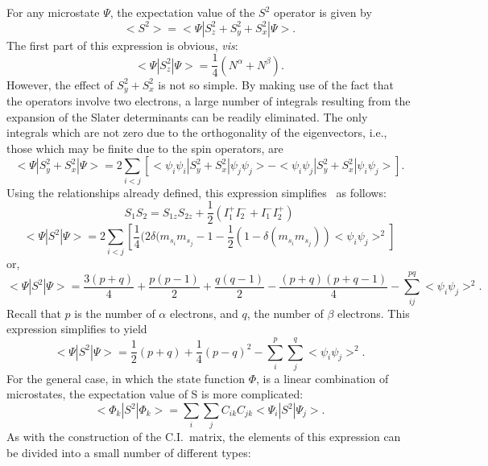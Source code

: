 For any microstate $\Psi$, the expectation value of the $S^2$ operator is
given by
$$
<S^2>=<\Psi|S_z^2+S_y^2+S_x^2|\Psi>.
$$
The first part of this expression is obvious, {\em vis}:
$$
<\Psi|S_z^2|\Psi> = \frac{1}{4}(N^{\alpha}+N^{\beta}).
$$
However, the effect of $S_y^2+S_x^2$ is not so simple. By making use of the
fact that the operators involve two electrons, a large number of integrals
resulting from the expansion of the Slater determinants can be readily
eliminated. The only integrals which are not zero due to the orthogonality of
the eigenvectors, i.e., those which may be finite due to the spin operators,
are
$$
<\Psi|S_y^2+S_x^2|\Psi>  = 2\sum_{i<j}[<\psi_i\psi_i|S_y^2+S_x^2|\psi_j\psi_j>-
<\psi_i\psi_j|S_y^2+S_x^2|\psi_i\psi_j>].
$$
Using the relationships already defined, this expression
simplifies~\cite{delaat} as follows:
$$
S_1S_2=S_{1z}S_{2z}+\frac{1}{2}(I_1^+I_2^-+I_1^-I_2^+)
$$
$$
<\Psi|S^2|\Psi> = 2\sum_{i<j}[\frac{1}{4}(2\delta(m_{s_i}m_{s_j}
-1-\frac{1}{2}(1-\delta(m_{s_i}m_{s_j}))<\psi_i\psi_j>^2]
$$
 or,
$$
<\Psi|S^2|\Psi> =\frac{3(p+q)}{4}+\frac{p(p-1)}{2}+\frac{q(q-1)}{2}
-\frac{(p+q)(p+q-1)}{4}-\sum_{ij}^{pq}<\psi_i\psi_j>^2.
$$
Recall that $p$ is the number of $\alpha$ electrons, and $q$, the number of
$\beta$ electrons.  This expression simplifies to yield
$$
<\Psi|S^2|\Psi> =\frac{1}{2}(p+q)+\frac{1}{4}(p-q)^2-
\sum_i^p\sum_j^q<\psi_i\psi_j>^2.
$$
For the general case, in which the state function $\Phi$, is a
linear combination of microstates, the expectation value of
S is more complicated:
$$
<\Phi_k|S^2|\Phi_k> = \sum_i\sum_jC_{ik}C_{jk}<\Psi_i|S^2|\Psi_j> .
$$
As with the construction of the C.I.\ matrix, the elements of this expression
can be divided into a small number of different types:
